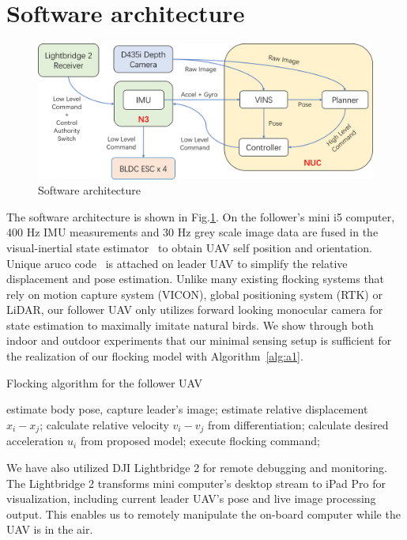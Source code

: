 \section{Software architecture}\label{software}

\begin{figure}[ht]
  \centering
  \includegraphics[width=1.0\textwidth]{figure/chapter_4/system_diagram.png}
  \caption{Software architecture}
  \label{fig:software_architecture}
\end{figure}

The software architecture is shown in Fig.\ref{fig:software_architecture}. On the follower's mini i5 computer, 400 Hz IMU measurements and 30 Hz grey scale image data are fused in the visual-inertial state estimator~\cite{VINS} to obtain UAV self position and orientation. Unique aruco code~\cite{Aruco} is attached on leader UAV to simplify the relative displacement and pose estimation. Unlike many existing flocking systems that rely on motion capture system (VICON), global positioning system (RTK) or LiDAR, our follower UAV only utilizes forward looking monocular camera for state estimation to maximally imitate natural birds. We show through both indoor and outdoor experiments that our minimal sensing setup is sufficient for the realization of our flocking model with Algorithm~\ref{alg:a1}.

\begin{algorithm}[h]
  \caption{Flocking algorithm for the follower UAV}
  \label{alg:a1}
  \begin{algorithmic}[1]
      \State estimate body pose, capture leader's image;
        \State estimate relative displacement $\mathit{x_i-x_j}$;
        \State calculate relative velocity $\mathit{v_i-v_j}$ from differentiation;
        \State calculate desired acceleration $\mathit{u_i}$ from proposed model;
        \State execute flocking command;
      \EndWhile
    \EndIf
  \end{algorithmic}
\end{algorithm}

We have also utilized DJI Lightbridge 2 for remote debugging and monitoring. The Lightbridge 2 transforms mini computer's desktop stream to iPad Pro for visualization, including current leader UAV's pose and live image processing output. This enables us to remotely manipulate the on-board computer while the UAV is in the air.

\newpage
